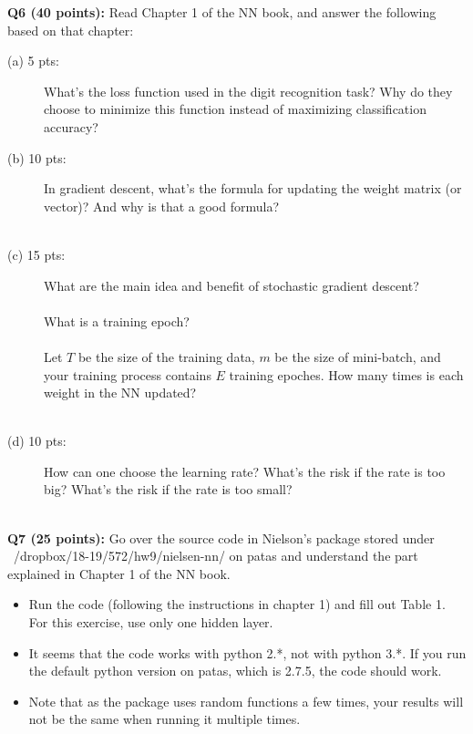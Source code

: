 \documentclass[11pt]{article}
\begin{document}
\vspace{0.4in}
\hspace{-0.3in}
{\bf Q6 (40 points):} Read Chapter 1 of the NN book, and answer the following
       based on that chapter:

\begin{description}
\item [(a) 5 pts:] What's the loss function used in the digit
  recognition task? Why do they choose to minimize
  this function instead of maximizing classification accuracy? \\

\item [(b) 10 pts:] In gradient descent, what's the formula for updating
   the weight matrix (or vector)? And why is that a good formula? \\ \\


\item [(c) 15 pts:] What are the main idea and benefit
  of stochastic gradient descent? \\ \\

  What is a training epoch? \\ \\

  Let $T$ be the size of the training data, $m$ be the size of mini-batch,
  and your training process contains $E$ training epoches.
  How many times is each weight in the NN updated? \\ \\ 


\item [(d) 10 pts:] How can one choose the learning rate? What's the risk
  if the rate is too big? What's the risk if the rate is too
  small? \\ \\ 

\end{description}



\vspace{0.5 in}
\hspace{-0.3in}
{\bf Q7 (25 points):} Go over the source code in Nielson's package
stored under ~/dropbox/18-19/572/hw9/nielsen-nn/ on patas
and understand the part explained in Chapter 1 of the NN book.
\begin{itemize}
\item Run the code (following the instructions in chapter 1) and
  fill out Table 1. For this exercise, use only one hidden layer.

\item It seems that the code works with python 2.*, not with python 3.*.
  If you run the default python version on patas, which is 2.7.5,
  the code should work.

\item Note that as the package uses random functions a few times, your
  results will not be the same when running it multiple times.

\end{itemize}
\end{document}
